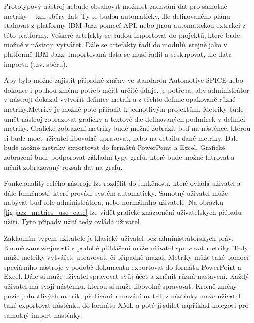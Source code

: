 \documentclass[czech,master]{diploma}
\begin{document}
Prototypový nástroj nebude obsahovat možnost zadávání dat pro samotné metriky -- tzn. sběry dat. Ty se budou automaticky, dle definovaného plánu, stahovat z platformy IBM Jazz pomocí API, nebo jinou automatickou extrakcí z této platformy. Veškeré artefakty se budou importovat do projektů, které bude možné v nástroji vytvářet. Dále se artefakty řadí do modulů, stejně jako v platformě IBM Jazz. Importovaná data se musí řadit a seskupovat, dle data importu (tzv. sběru).

Aby bylo možné zajistit případné změny ve standardu Automotive SPICE nebo dokonce i pouhou změnu potřeb měřit určité údaje, je potřeba, aby administrátor v nástroji dokázal vytvořit definice metrik a z těchto definic opakovaně různé metriky.Metriky je možné poté přiřadit k jednotlivým projektům. Metriky bude umět nástroj zobrazovat graficky a textově dle definovaných podmínek v definici metriky. Grafické zobrazení metriky bude možné zobrazit buď na nástěnce, kterou si bude moct uživatel libovolně upravovat, nebo na detailu dané metriky. Dále bude možné metriky exportovat do formátů PowerPoint a Excel. Grafické zobrazení bude podporovat základní typy grafů, které bude možné filtrovat a měnit zobrazovaný rozsah dat na grafu.

Funkcionality celého nástroje lze rozdělit do funkčností, které ovládá uživatel a dále funkčností, které provádí systém automaticky. Samotný uživatel může nabývat buď role administrátora, nebo normálního uživatele. Na obrázku \ref{fig:jazz_metrics_use_case} lze vidět grafické znázornění uživatelských případu užití. Tyto případy užití tedy ovládá uživatel.

Základním typem uživatele je klasický uživatel bez administrátorských práv. Kromě samozřejmosti v podobě přihlášení může uživatel spravovat metriky. Tedy může metriky vytvářet, upravovat, či případně mazat. Metriky může také pomocí speciálního nástroje v podobě dokumentu exportovat do formátu PowerPoint a Excel. Dále si může uživatel spravovat svůj účet a změnit různá nastavení. Každý uživatel má svojí nástěnku, kterou si může libovolně spravovat. Kromě změny pozic jednotlivých metrik, přidávání a mazání metrik z nástěnky může uživatel také exportovat nástěnku do formátu XML a poté ji sdílet například kolegovi pro samotný import nástěnky.
\end{document}
